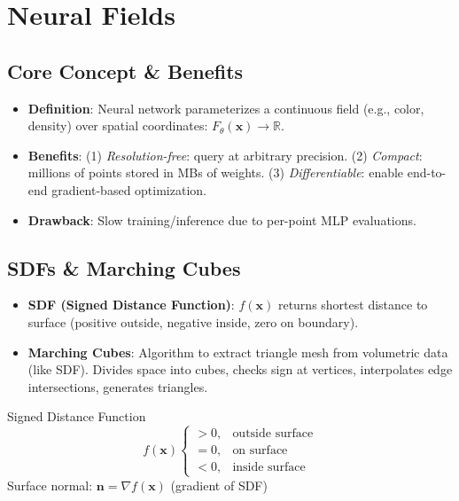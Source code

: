 \documentclass[11pt]{article}
\begin{document}
\section{Neural Fields}
\subsection{Core Concept \& Benefits}
\begin{itemize}
    \item \textbf{Definition}: Neural network parameterizes a continuous field (e.g., color, density) over spatial coordinates: $F_\theta(\mathbf{x}) \rightarrow \mathbb{R}$.
    \item \textbf{Benefits}: (1) \textit{Resolution-free}: query at arbitrary precision. (2) \textit{Compact}: millions of points stored in MBs of weights. (3) \textit{Differentiable}: enable end-to-end gradient-based optimization.
    \item \textbf{Drawback}: Slow training/inference due to per-point MLP evaluations.
\end{itemize}

\subsection{SDFs \& Marching Cubes}
\begin{itemize}
    \item \textbf{SDF (Signed Distance Function)}: $f(\mathbf{x})$ returns shortest distance to surface (positive outside, negative inside, zero on boundary).
    \item \textbf{Marching Cubes}: Algorithm to extract triangle mesh from volumetric data (like SDF). Divides space into cubes, checks sign at vertices, interpolates edge intersections, generates triangles.
\end{itemize}

\begin{formulabox}{Signed Distance Function}
$$f(\mathbf{x}) \begin{cases}
> 0, & \text{outside surface} \\
= 0, & \text{on surface} \\
< 0, & \text{inside surface}
\end{cases}$$
Surface normal: $\mathbf{n} = \nabla f(\mathbf{x})$ (gradient of SDF)
\end{formulabox}
\end{document}
